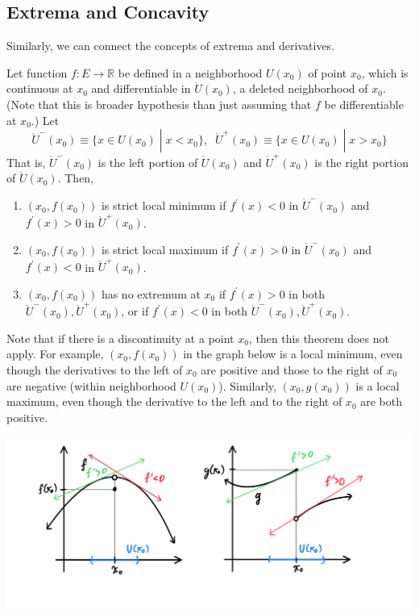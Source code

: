 \subsection{Extrema and Concavity}

  Similarly, we can connect the concepts of extrema and derivatives. 

  \begin{theorem}
    Let function $f: E \longrightarrow \mathbb{R}$ be defined in a neighborhood $U(x_0)$ of point $x_0$, which is continuous at $x_0$ and differentiable in $\mathring{U}(x_0)$, a deleted neighborhood of $x_0$. (Note that this is broader hypothesis than just assuming that $f$ be differentiable at $x_0$.) Let
    \[\mathring{U}^- (x_0) \equiv \{x \in U(x_0) \;|\; x < x_0\}, \;\; \mathring{U}^+ (x_0) \equiv \{x \in U(x_0) \;|\; x > x_0\}\]
    That is, $\mathring{U}^- (x_0)$ is the left portion of $\mathring{U}(x_0)$ and $\mathring{U}^+ (x_0)$ is the right portion of $\mathring{U}(x_0)$. Then, 
    \begin{enumerate}
      \item $(x_0, f(x_0))$ is strict local minimum if $f^\prime(x) < 0$ in $\mathring{U}^- (x_0)$ and $f^\prime (x) > 0$ in $\mathring{U}^+ (x_0)$. 

      \item $(x_0, f(x_0))$ is strict local maximum if $f^\prime(x) > 0$ in $\mathring{U}^- (x_0)$ and $f^\prime (x) < 0$ in $\mathring{U}^+ (x_0)$. 

      \item $(x_0, f(x_0))$ has no extremum at $x_0$ if $f^\prime (x) > 0$ in both $\mathring{U}^- (x_0), \mathring{U}^+ (x_0)$, or if $f^\prime(x)< 0$ in both $\mathring{U}^- (x_0), \mathring{U}^+ (x_0)$. 
    \end{enumerate}
  \end{theorem}

  Note that if there is a discontinuity at a point $x_0$, then this theorem does not apply. For example, $(x_0, f(x_0))$ in the graph below is a local minimum, even though the derivatives to the left of $x_0$ are positive and those to the right of $x_0$ are negative (within neighborhood $U(x_0)$). Similarly, $(x_0, g(x_0))$ is a local maximum, even though the derivative to the left and to the right of $x_0$ are both positive. 
  \begin{center}
      \includegraphics[scale=0.3]{img/Theorem_not_apply_if_Discontinuity.PNG}
  \end{center}

